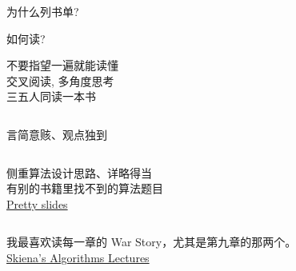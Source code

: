 \begin{frame}{为什么列书单?}
\end{frame}

\begin{frame}{如何读?}
  \begin{center}
    不要指望一遍就能读懂\\[10pt]

    交叉阅读, 多角度思考\\[10pt]

    三五人同读一本书\\
  \end{center}
\end{frame}

\begin{frame}{}
  \begin{columns}
  \end{columns}

  \vspace{0.80cm}
  \centerline{言简意赅、观点独到}
\end{frame}

\begin{frame}{}
  \begin{columns}
  \end{columns}

  \vspace{0.10cm}
  \begin{center}
    侧重算法设计思路、详略得当 \\[6pt]
    有别的书籍里找不到的算法题目 \\[10pt]

    \href{http://www.cs.princeton.edu/~wayne/kleinberg-tardos/}{Pretty slides}
  \end{center}
\end{frame}

\begin{frame}{}
  \begin{columns}
  \end{columns}

  \vspace{0.50cm}
  \begin{center}
    我最喜欢读每一章的 War Story，尤其是第九章的那两个。\\[10pt]

    \href{http://www3.cs.stonybrook.edu/~algorith/video-lectures/}{Skiena's Algorithms Lectures}
  \end{center}
\end{frame}

